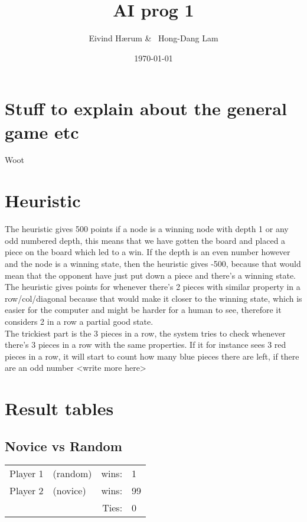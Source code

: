 \documentclass[12pt, a4paper]{article}
\title{AI prog 1}
\author{Eivind Hærum \& \ Hong-Dang Lam}
\date{\today} %
\begin{document}
\maketitle
% 
% 
 
\newpage
\tableofcontents
\newpage
 
\section{Stuff to explain about the general game etc}
Woot

\section{Heuristic}
The heuristic gives 500 points if a node is a winning node with depth 1 or any odd numbered depth, this means that we have gotten the board and placed a piece on the board which led to a win. If the depth is an even number however and the node is a winning state, then the heuristic gives -500, because that would mean that the opponent have just put down a piece and there's a winning state. \\
The heuristic gives points for whenever there's 2 pieces with similar property in a row/col/diagonal because that would make it closer to the winning state, which is easier for the computer and might be harder for a human to see, therefore it considers 2 in a row a partial good state. \\
The trickiest part is the 3 pieces in a row, the system tries to check whenever there's 3 pieces in a row with the same properties. If it for instance sees 3 red pieces in a row, it will start to count how many blue pieces there are left, if there are an odd number <write  more here>



\section{Result tables}

\subsection{Novice vs Random}
  \begin{tabular}{| l  l  r l |}
    \hline
 	Player 1 & (random) & wins: & 1 \\
 	Player 2 & (novice) & wins: & 99 \\
 	& &  Ties: & 0 \\
    \hline
  \end{tabular}
\end{document}
